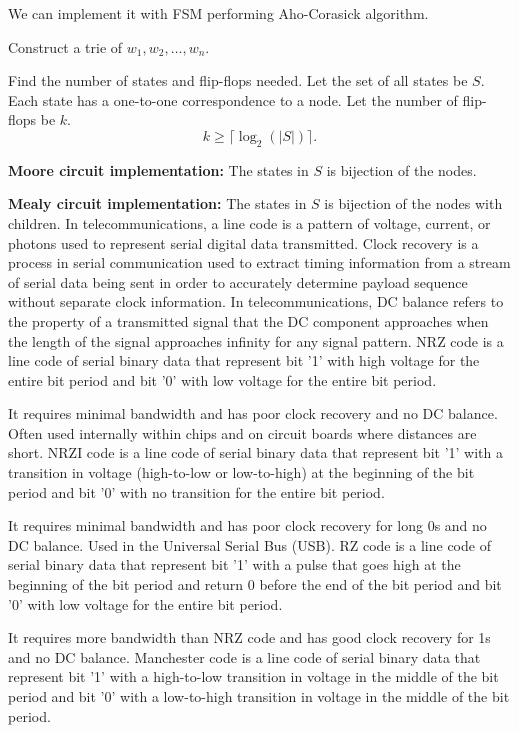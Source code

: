 \documentclass[a4paper,12pt]{report}
\begin{document}
We can implement it with FSM performing Aho-Corasick algorithm.
\ben
\item Construct a trie of $w_1,w_2,\ldots,w_n$.
\item Find the number of states and flip-flops needed. Let the set of all states be $S$. Each state has a one-to-one correspondence to a node. Let the number of flip-flops be $k$.
\[k\geq\lceil\log_2(|S|)\rceil.\]
\bit
\item \textbf{Moore circuit implementation:} The states in $S$ is bijection of the nodes.
\item \textbf{Mealy circuit implementation:} The states in $S$ is bijection of the nodes with children.
\eit
\een
{}
In telecommunications, a line code is a pattern of voltage, current, or photons used to represent serial digital data transmitted.
Clock recovery is a process in serial communication used to extract timing information from a stream of serial data being sent in order to accurately determine payload sequence without separate clock information.
In telecommunications, DC balance refers to the property of a transmitted signal that the DC component approaches when the length of the signal approaches infinity for any signal pattern.
NRZ code is a line code of serial binary data that represent bit '1' with high voltage for the entire bit period and bit '0' with low voltage for the entire bit period.

It requires minimal bandwidth and has poor clock recovery and no DC balance. Often used internally within chips and on circuit boards where distances are short.
NRZI code is a line code of serial binary data that represent bit '1' with a transition in voltage (high-to-low or low-to-high) at the beginning of the bit period and bit '0' with no transition for the entire bit period.

It requires minimal bandwidth and has poor clock recovery for long 0s and no DC balance. Used in the Universal Serial Bus (USB).
RZ code is a line code of serial binary data that represent bit '1' with a pulse that goes high at the beginning of the bit period and return 0 before the end of the bit period and bit '0' with low voltage for the entire bit period.

It requires more bandwidth than NRZ code and has good clock recovery for 1s and no DC balance.
Manchester code is a line code of serial binary data that represent bit '1' with a high-to-low transition in voltage in the middle of the bit period and bit '0' with a low-to-high transition in voltage in the middle of the bit period.
\end{document}
